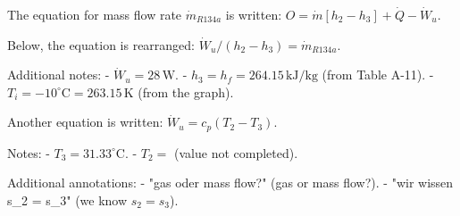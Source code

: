 The equation for mass flow rate \( \dot{m}_{R134a} \) is written:  
\( O = \dot{m} [h_2 - h_3] + \dot{Q} - \dot{W}_u \).  

Below, the equation is rearranged:  
\( \dot{W}_u / (h_2 - h_3) = \dot{m}_{R134a} \).  

Additional notes:  
- \( \dot{W}_u = 28 \, \text{W} \).  
- \( h_3 = h_f = 264.15 \, \text{kJ/kg} \) (from Table A-11).  
- \( T_i = -10^\circ \text{C} = 263.15 \, \text{K} \) (from the graph).  

Another equation is written:  
\( \dot{W}_u = c_p (T_2 - T_3) \).  

Notes:  
- \( T_3 = 31.33^\circ \text{C} \).  
- \( T_2 = \) (value not completed).  

Additional annotations:  
- "gas oder mass flow?" (gas or mass flow?).  
- "wir wissen s_2 = s_3" (we know \( s_2 = s_3 \)).